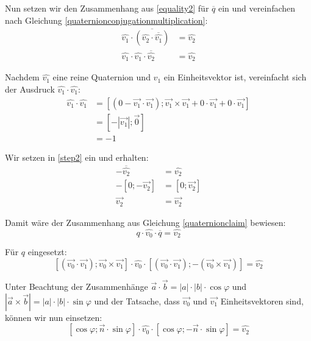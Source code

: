 Nun setzen wir den Zusammenhang aus \ref{equality2} für $\overline{q}$ ein und vereinfachen nach Gleichung \ref{quaternionconjugationmultiplication}:
\begin{equation}
\begin{split}
 \label{step2}
 \hat{v_1} \cdot \overline{\left( \hat{v_2} \cdot \overline{\hat{v_1}} \right)} &= \hat{v_2} \\
 \hat{v_1} \cdot \hat{v_1} \cdot \overline{\hat{v_2}} &= \hat{v_2}
\end{split}
\end{equation}

Nachdem $\hat{v_1}$ eine reine Quaternion und $v_1$ ein Einheitsvektor ist, vereinfacht sich der Ausdruck $\hat{v_1} \cdot \hat{v_1}$:
\begin{equation}
\begin{split}
 \hat{v_1} \cdot \hat{v_1} &= \left[ \left( 0 - \vec{v_1} \cdot \vec{v_1} \right); \vec{v_1} \times \vec{v_1} + 0 \cdot \vec{v_1} + 0 \cdot \vec{v_1} \right] \\
 &= \left[ -\left| \vec{v_1} \right|; \vec 0 \right] \\
 &= -1
\end{split}
\end{equation}

Wir setzen in \ref{step2} ein und erhalten:
\begin{equation}
\begin{split}
 -\overline{\hat{v_2}} &= \hat{v_2} \\
 -\left[ 0; -\vec{v_2} \right] &= \left[ 0; \vec{v_2} \right] \\
 \vec{v_2} &= \vec{v_2}
\end{split}
\end{equation}

Damit wäre der Zusammenhang aus Gleichung \ref{quaternionclaim} bewiesen:
\begin{equation*}
 q \cdot \hat{v_0} \cdot \overline{q} = \hat{v_2}
\end{equation*}

Für $q$ eingesetzt:
\begin{equation*}
 \left[ ( \vec{v_0} \cdot \vec{v_1} ); \vec{v_0} \times \vec{v_1} \right] \cdot \hat{v_0} \cdot \left[ ( \vec{v_0} \cdot \vec{v_1} ); -(\vec{v_0} \times \vec{v_1} ) \right] = \hat{v_2}
\end{equation*} 

Unter Beachtung der Zusammenhänge $\vec a \cdot \vec b = \left| a \right| \cdot \left| b \right| \cdot \cos \varphi$ und $\left| \vec a \times \vec b \right| = \left| a \right| \cdot \left| b \right| \cdot \sin \varphi$ und der Tatsache, dass $\vec{v_0}$ und $\vec{v_1}$ Einheitsvektoren sind, können wir nun einsetzen:
\begin{equation}
 \left[ \cos \varphi; \vec n \cdot \sin \varphi \right] \cdot \hat{v_0} \cdot \left[ \cos \varphi; -\vec n \cdot \sin \varphi \right] = \hat{v_2}
\end{equation}

